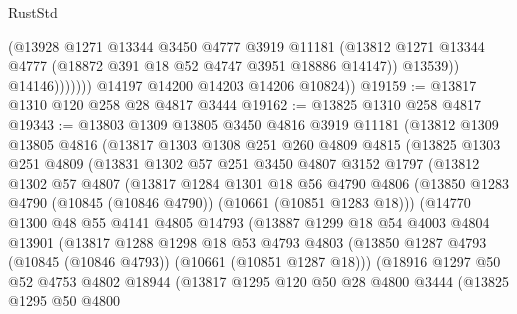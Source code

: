 \begin{lexlean}{RustStd}
\begin{coremodule}
                        (@13928
                          @1271
                          @13344
                          @3450
                          @4777
                          @3919
                          @11181
                          (@13812
                            @1271
                            @13344
                            @4777
                            (@18872 @391 @18 @52 @4747 @3951 @18886 @14147))
                          @13539))
                      @14146)))))))
        @14197
        @14200
        @14203
        @14206
        @10824))
@19159 := @13817 @1310 @120 @258 @28 @4817 @3444
@19162 := @13825 @1310 @258 @4817
@19343 := @13803
    @1309
    @13805
    @3450
    @4816
    @3919
    @11181
    (@13812
      @1309
      @13805
      @4816
      (@13817
        @1303
        @1308
        @251
        @260
        @4809
        @4815
        (@13825
          @1303
          @251
          @4809
          (@13831
            @1302
            @57
            @251
            @3450
            @4807
            @3152
            @1797
            (@13812
              @1302
              @57
              @4807
              (@13817
                @1284
                @1301
                @18
                @56
                @4790
                @4806
                (@13850 @1283 @4790 (@10845 (@10846 @4790)) (@10661 (@10851 @1283 @18)))
                (@14770
                  @1300
                  @48
                  @55
                  @4141
                  @4805
                  @14793
                  (@13887
                    @1299
                    @18
                    @54
                    @4003
                    @4804
                    @13901
                    (@13817
                      @1288
                      @1298
                      @18
                      @53
                      @4793
                      @4803
                      (@13850 @1287 @4793 (@10845 (@10846 @4793)) (@10661 (@10851 @1287 @18)))
                      (@18916
                        @1297
                        @50
                        @52
                        @4753
                        @4802
                        @18944
                        (@13817
                          @1295
                          @120
                          @50
                          @28
                          @4800
                          @3444
                          (@13825
                            @1295
                            @50
                            @4800

\end{coremodule}
\end{lexlean}
